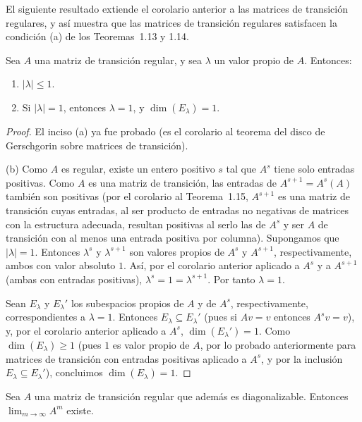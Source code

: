\documentclass[12pt,a4paper]{book}
\begin{document}
    El siguiente resultado extiende el corolario anterior a las matrices de transición regulares, y así muestra que las matrices de transición regulares satisfacen la condición (a) de los Teoremas~1.13 y 1.14.

    \begin{teorema}
        Sea $A$ una matriz de transición regular, y sea $\lambda$ un valor propio de $A$. Entonces:
        \begin{enumerate}[label=(\alph*)]
            \item $|\lambda|\leq 1$.
            \item Si $|\lambda|=1$, entonces $\lambda=1$, y $\dim(E_\lambda)=1$.
        \end{enumerate}
    \end{teorema}

    \begin{proof}
        El inciso (a) ya fue probado (es el corolario al teorema del disco de Gerschgorin sobre matrices de transición).

        (b) Como $A$ es regular, existe un entero positivo $s$ tal que $A^s$ tiene solo entradas positivas. Como $A$ es una matriz de transición, las entradas de $A^{s+1}=A^s(A)$ también son positivas (por el corolario al Teorema~1.15, $A^{s+1}$ es una matriz de transición cuyas entradas, al ser producto de entradas no negativas de matrices con la estructura adecuada, resultan positivas al serlo las de $A^s$ y ser $A$ de transición con al menos una entrada positiva por columna). Supongamos que $|\lambda|=1$. Entonces $\lambda^s$ y $\lambda^{s+1}$ son valores propios de $A^s$ y $A^{s+1}$, respectivamente, ambos con valor absoluto $1$. Así, por el corolario anterior aplicado a $A^s$ y a $A^{s+1}$ (ambas con entradas positivas), $\lambda^s=1=\lambda^{s+1}$. Por tanto $\lambda=1$.

        Sean $E_\lambda$ y $E_\lambda'$ los subespacios propios de $A$ y de $A^s$, respectivamente, correspondientes a $\lambda=1$. Entonces $E_\lambda\subseteq E_\lambda'$ (pues si $Av=v$ entonces $A^sv=v$), y, por el corolario anterior aplicado a $A^s$, $\dim(E_\lambda')=1$. Como $\dim(E_\lambda)\geq 1$ (pues $1$ es valor propio de $A$, por lo probado anteriormente para matrices de transición con entradas positivas aplicado a $A^s$, y por la inclusión $E_\lambda \subseteq E_\lambda'$), concluimos $\dim(E_\lambda)=1$.
    \end{proof}

    \begin{corolario}
        Sea $A$ una matriz de transición regular que además es diagonalizable. Entonces $\lim_{m\to\infty}A^m$ existe.
    \end{corolario}
\end{document}
